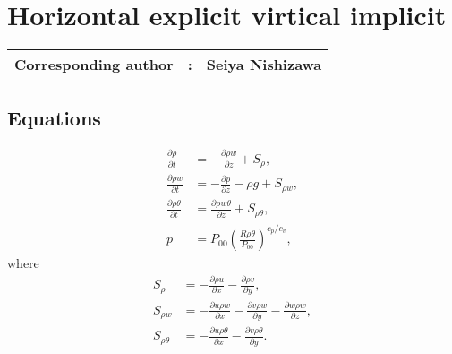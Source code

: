 \chapter{Horizontal explicit virtical implicit}
\label{chap:hevi}
{\bf \Large 
\begin{tabular}{ccc}
\hline
  Corresponding author & : & Seiya Nishizawa\\
\hline
\end{tabular}
}

\section{Equations}

\begin{align}
  \frac{\partial \rho}{\partial t}
  &= -\frac{\partial \rho w}{\partial z} + S_\rho, \\
  \frac{\partial \rho w}{\partial t}
  &= -\frac{\partial p}{\partial z} -\rho g + S_{\rho w}, \\
  \frac{\partial \rho\theta}{\partial t}
  &= \frac{\partial \rho w\theta}{\partial z} + S_{\rho\theta}, \\
  p &= P_{00}\left(\frac{R\rho\theta}{P_{00}}\right)^{c_p/c_v},
\end{align}
where
\begin{align}
  S_\rho &= - \frac{\partial \rho u}{\partial x}
           - \frac{\partial \rho v}{\partial y}, \\
  S_{\rho w} &= - \frac{\partial u\rho w}{\partial x}
              - \frac{\partial v\rho w}{\partial y}
              - \frac{\partial w\rho w}{\partial z}, \\
  S_{\rho\theta} &= - \frac{\partial u\rho\theta}{\partial x}
                 - \frac{\partial v\rho\theta}{\partial y}.
\end{align}

